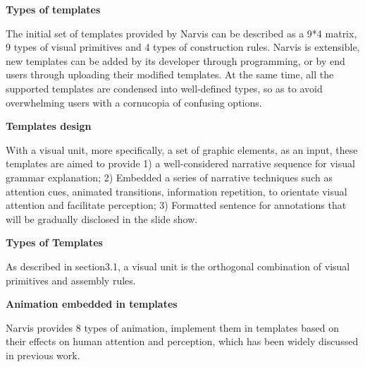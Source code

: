 \textbf{Types of templates}

The initial set of templates provided by Narvis can be described as  a 9*4 matrix, 9 types of visual primitives and 4 types of construction rules. Narvis is extensible, new templates can be added by its developer through programming, or by end users through uploading their modified templates. At the same time, all the supported templates are condensed into well-defined types, so as to avoid overwhelming users with a cornucopia of confusing options.

\textbf{Templates design}

With a visual unit, more specifically, a set of graphic elements, as an input, these templates are aimed to provide 1) a well-considered narrative sequence for visual grammar explanation; 2) Embedded a series of narrative techniques such as attention cues, animated transitions, information repetition, to orientate visual attention and facilitate perception; 3) Formatted sentence for annotations that will be gradually disclosed in the slide show. 

\textbf{Types of Templates}

As described in section3.1, a visual unit is the orthogonal combination of visual primitives and assembly rules.   

\textbf{Animation embedded in templates }

Narvis provides 8 types of animation, implement them in templates based on their effects on human attention and perception, which has been widely discussed in previous work.\cite{robertson_effectiveness_2008, waldner_attractive_2014, heer_animated_2007}

